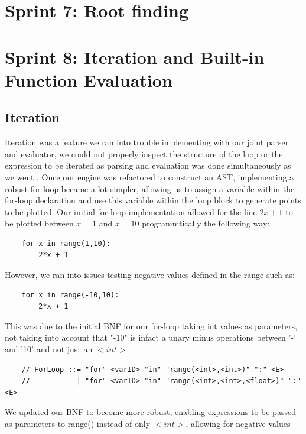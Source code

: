 \documentclass[a4paper, oneside, 11pt]{report}
\begin{document}
\section{Sprint 7: Root finding}
\section{Sprint 8: Iteration and Built-in Function Evaluation}

\subsection{Iteration}
Iteration was a feature we ran into trouble implementing with our joint parser and evaluator, we could not properly inspect the structure of the loop or the expression to be iterated as parsing and evaluation was done simultaneously as we went . Once our engine was refactored to construct an AST, implementing a robust for-loop became a lot simpler, allowing us to assign a variable within the for-loop declaration and use this variable within the loop block to generate points to be plotted. Our initial for-loop implementation allowed for the line $2x+1$ to be plotted between $x = 1$ and $x = 10$ programmtically the following way:

\begin{verbatim}
    for x in range(1,10):
        2*x + 1
\end{verbatim}

However, we ran into issues testing negative values defined in the range such as:

\begin{verbatim}
    for x in range(-10,10):
        2*x + 1
\end{verbatim}

This was due to the initial BNF for our for-loop taking int values as parameters, not taking into account that "-10" is infact a unary minus operations between '-' and '10' and not just an $<int>$.

\begin{verbatim}
    // ForLoop ::= "for" <varID> "in" "range(<int>,<int>)" ":" <E>
    //           | "for" <varID> "in" "range(<int>,<int>,<float>)" ":" <E>
\end{verbatim}



We updated our BNF to become more robust, enabling expressions to be passed as parameters to range() instead of only $<int>$, allowing for negative values
\end{document}
